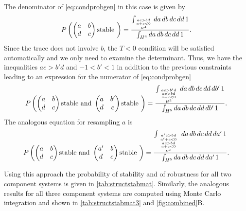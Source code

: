 The denominator of \ref{eq:condprobgen} in this case is given by
\begin{align*}
P\left(\begin{pmatrix}
a & b \\
d & c
\end{pmatrix} \textrm{stable } \right) = \frac{\int_{\genfrac{}{}{0pt}{}{\genfrac{}{}{0pt}{}{ac>bd}{a+c<0}}{H^4}} da\,db\,dc\,dd\,1}{\int_{H^4} da\,db\,dc\,dd\,1}.
\end{align*}
Since the trace does not involve $b$, the $T<0$ condition will be satisfied automatically and we only need to examine the determinant. Thus, we have the inequalities $ac > b'd$ and $-1 < b' < 1$ in addition to the previous constraints leading to an expression for the numerator of \ref{eq:condprobgen}
\begin{align*}
P\left(\begin{pmatrix}
a & b \\
d & c
\end{pmatrix} \textrm{stable and } \begin{pmatrix}
a & b' \\
d & c
\end{pmatrix} \textrm{stable } \right) = \frac{\int_{{{ac>b'd \atop ac>bd} \atop a+c<0} \atop H^5} da\,db\,dc\,dd\,db'\,1}{\int_{H^5} da\,db\,dc\,dd\,db'\,1}.
\end{align*}
The analogous equation for resampling $a$ is
\begin{align*}
P\left(\begin{pmatrix}
a & b \\
d & c
\end{pmatrix} \textrm{stable and } \begin{pmatrix}
a' & b \\
d & c
\end{pmatrix} \textrm{stable } \right) = \frac{\int_{{{{a'c>bd \atop a' + c < 0} \atop ac>bd} \atop a+c<0} \atop H^5} da\,db\,dc\,dd\,da'\,1}{\int_{H^5} da\,db\,dc\,dd\,da'\,1}.
\end{align*}

Using this approach the probability of stability and of robustness for all two component systems is given in \ref{tab:structstabmat}. Similarly, the analogous results for all three component systems are computed using Monte Carlo integration and shown in \ref{tab:structstabmat3} and \ref{fig:combined}B.

